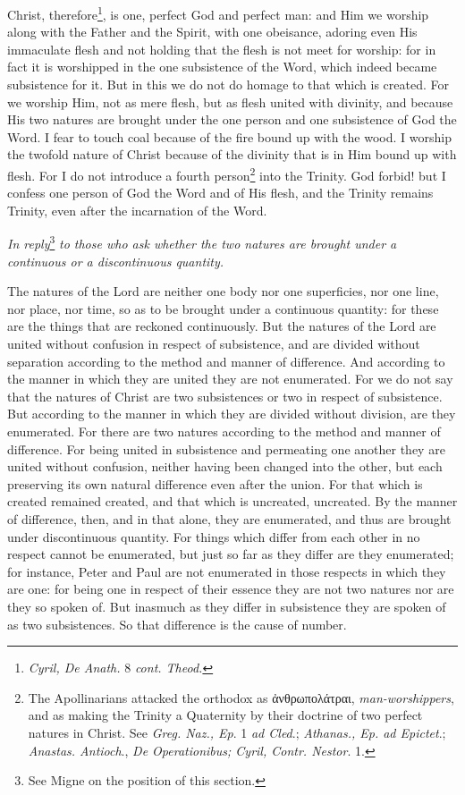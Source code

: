Christ, therefore\footnote{\emph{Cyril, De Anath. }8 \emph{cont. Theod.}}, is one, perfect God and perfect man: and Him we worship along with the Father and the Spirit, with one obeisance, adoring even His immaculate flesh and not holding that the flesh is not meet for worship: for in fact it is worshipped in the one subsistence of the Word, which indeed became subsistence for it. But in this we do not do homage to that which is created. For we worship Him, not as mere flesh, but as flesh united with divinity, and because His two natures are brought under the one person and one subsistence of God the Word. I fear to touch coal because of the fire bound up with the wood. I worship the twofold nature of Christ because of the divinity that is in Him bound up with flesh. For I do not introduce a fourth person\footnote{The Apollinarians attacked the orthodox as \textgreek{ἀνθρωπολάτραι}, \emph{man-worshippers}, and as making the Trinity a Quaternity by their doctrine of two perfect natures in Christ. See \emph{Greg. Naz., Ep}. 1 \emph{ad Cled}.; \emph{Athanas., Ep. ad Epictet}.; \emph{Anastas. Antioch}., \emph{De Operationibus; Cyril, Contr. Nestor}. 1.} into the Trinity. God forbid! but I confess one person of God the Word and of His flesh, and the Trinity remains Trinity, even after the incarnation of the Word.

\emph{In reply}\footnote{See Migne on the position of this section.} \emph{to those who ask whether the two natures are brought under a continuous or a discontinuous quantity.}

The natures of the Lord are neither one body nor one superficies, nor one line, nor place, nor time, so as to be brought under a continuous quantity: for these are the things that are reckoned continuously. But the natures of the Lord are united without confusion in respect of subsistence, and are divided without separation according to the method and manner of difference. And according to the manner in which they are united they are not enumerated. For we do not say that the natures of Christ are two subsistences or two in respect of subsistence. But according to the manner in which they are divided without division, are they enumerated. For there are two natures according to the method and manner of difference. For being united in subsistence and permeating one another they are united without confusion, neither having been changed into the other, but each preserving its own natural difference even after the union. For that which is created remained created, and that which is uncreated, uncreated. By the manner of difference, then, and in that alone, they are enumerated, and thus are brought under discontinuous quantity. For things which differ from each other in no respect cannot be enumerated, but just so far as they differ are they enumerated; for instance, Peter and Paul are not enumerated in those respects in which they are one: for being one in respect of their essence they are not two natures nor are they so spoken of. But inasmuch as they differ in subsistence they are spoken of as two subsistences. So that difference is the cause of number.

